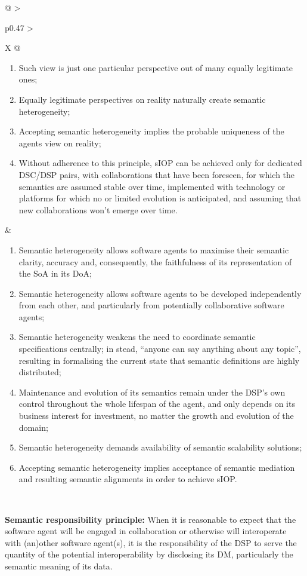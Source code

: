 \begin{xltabular}[l]{\linewidth}{@{} >{\small\raggedright\arraybackslash}p{0.47\linewidth} >{\small\raggedright\arraybackslash}X @{}}
\begin{enumerate}[left=6pt, nosep]
  \item Such view is just one particular perspective out of many equally legitimate ones;
  \item Equally legitimate perspectives on reality naturally create semantic heterogeneity;
  \item Accepting semantic heterogeneity implies the probable uniqueness of the agents view on reality;
  \item Without adherence to this principle, sIOP can be achieved only for dedicated DSC/DSP pairs, with collaborations that have been foreseen, for which the semantics are assumed stable over time, implemented with technology or platforms for which no or limited evolution is anticipated, and assuming that new collaborations won't emerge over time.
\end{enumerate}
&
\begin{enumerate}[left=10pt, nosep]
  \item Semantic heterogeneity allows software agents to maximise their semantic clarity, accuracy and, consequently, the faithfulness of its representation of the SoA in its DoA;
  \item Semantic heterogeneity allows software agents to be developed independently from each other, and particularly from potentially collaborative software agents;
  \item Semantic heterogeneity weakens the need to coordinate semantic specifications centrally; in stead, “anyone can say anything about any topic”, resulting in formalising the current state that semantic definitions are highly distributed;
  \item Maintenance and evolution of its semantics remain under the DSP’s own control throughout the whole lifespan of the agent, and only depends on its business interest for investment, no matter the growth and evolution of the domain;
  \item Semantic heterogeneity demands availability of semantic scalability solutions;
  \item Accepting semantic heterogeneity implies acceptance of semantic mediation and resulting semantic alignments in order to achieve sIOP.
\end{enumerate} \\
%
%
%
\begin{mmdp}\label{dp:srp}{\bfseries Semantic responsibility principle:}
\quad When it is reasonable to expect that the software agent will be engaged in collaboration or otherwise will interoperate with (an)other software agent(s), it is the responsibility of the DSP to serve the quantity of the potential interoperability by disclosing its DM, particularly the semantic meaning of its data.

\end{mmdp}
\end{xltabular}
